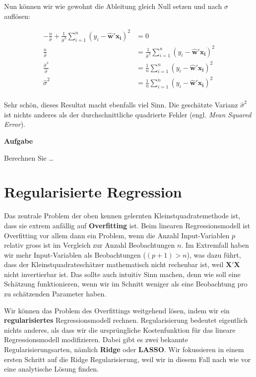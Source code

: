 \documentclass[
]{book}
\begin{document}
Nun können wir wie gewohnt die Ableitung gleich Null setzen und nach \(\sigma\) auflösen:

\begin{align}
-\frac{n}{\hat{\sigma}} + \frac{1}{\hat{\sigma}^3} \sum_{i=1}^n \left(y_i - \mathbf{\hat{w}}' \mathbf{x_i}\right)^{\!2} &= 0 \\
\frac{n}{\hat{\sigma}} &= \frac{1}{\hat{\sigma}^3} \sum_{i=1}^n \left(y_i - \mathbf{\hat{w}}' \mathbf{x_i}\right)^{\!2} \\
\frac{\hat{\sigma}^3}{\hat{\sigma}} &= \frac{1}{n} \sum_{i=1}^n \left(y_i - \mathbf{\hat{w}}' \mathbf{x_i}\right)^{\!2} \\
\hat{\sigma}^2 &= \frac{1}{n} \sum_{i=1}^n \left(y_i - \mathbf{\hat{w}}' \mathbf{x_i}\right)^{\!2} \\
\end{align}

Sehr schön, dieses Resultat macht ebenfalls viel Sinn. Die geschätzte Varianz \(\hat{\sigma}^2\) ist nichts anderes als der durchschnittliche quadrierte Fehler (engl. \emph{Mean Squared Error}).

\textbf{Aufgabe}

Berechnen Sie \ldots{}

\hypertarget{regularisierte-regression}{%
\section{Regularisierte Regression}\label{regularisierte-regression}}

Das zentrale Problem der oben kennen gelernten Kleinstquadratemethode ist, dass sie extrem anfällig auf \textbf{Overfitting} ist. Beim linearen Regressionsmodell ist Overfitting vor allem dann ein Problem, wenn die Anzahl Input-Variablen \(p\) relativ gross ist im Vergleich zur Anzahl Beobachtungen \(n\). Im Extremfall haben wir mehr Input-Variablen als Beobachtungen (\((p+1)>n\)), was dazu führt, dass der Kleinstquadrateschätzer mathematisch nicht rechenbar ist, weil \(\mathbf{X}'\mathbf{X}\) nicht invertierbar ist. Das sollte auch intuitiv Sinn machen, denn wie soll eine Schätzung funktionieren, wenn wir im Schnitt weniger als eine Beobachtung pro zu schätzenden Parameter haben.

Wir können das Problem des Overfittings weitgehend lösen, indem wir ein \textbf{regularisiertes} Regressionsmodell rechnen. Regularisierung bedeutet eigentlich nichts anderes, als dass wir die ursprüngliche Kostenfunktion für das lineare Regressionsmodell modifizieren. Dabei gibt es zwei bekannte Regularisierungsarten, nämlich \textbf{Ridge} oder \textbf{LASSO}. Wir fokussieren in einem ersten Schritt auf die Ridge Regularisierung, weil wir in diesem Fall nach wie vor eine analytische Lösung finden.
\end{document}

